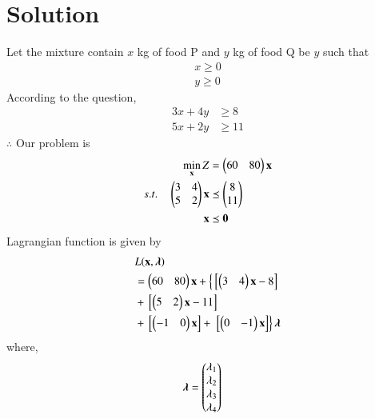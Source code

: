 \documentclass[journal,12pt,twocolumn]{IEEEtran}
\begin{document}
\section{Solution}
\begin{table}[!ht]
\centering
{}
\caption{Food Requirements}
\label{tab:table1}
\end{table}
Let the mixture contain $x$ kg of food P and $y$ kg of food Q be $y$  such that 
\begin{align}
    x \geq 0 \\
    y \geq 0 
\end{align}
According to the question,
\begin{align}
    3x+4y &\geq 8 \\
    5x+2y &\geq 11
\end{align}
$\therefore$ Our problem is
\begin{align}
        \min_{\mathbf{x}} Z &= \begin{pmatrix}60 & 80\end{pmatrix}\mathbf{x}\\
        s.t. \quad 
        \begin{pmatrix}3 & 4 \\ 5 & 2 \end{pmatrix}\mathbf{x} &\preceq \begin{pmatrix}8\\11\end{pmatrix} \\
        \mathbf{x} &\preceq \mathbf{0}
\end{align}
Lagrangian function is given by
\begin{equation}
\begin{aligned}
    &L(\mathbf{x},\boldsymbol{\lambda}) \\ &= \begin{pmatrix}60 & 80\end{pmatrix}\mathbf{x}+\left\{{}\left[\begin{pmatrix}3 & 4\end{pmatrix}\mathbf{x}-8\right]\right. \\ &+ {}\left[\begin{pmatrix}5 & 2\end{pmatrix}\mathbf{x}-11\right] \\ &+ {}\left[\begin{pmatrix}-1 & 0\end{pmatrix}\mathbf{x}\right] +\left.{}\left[\begin{pmatrix}0 & -1\end{pmatrix}\mathbf{x}\right]\right\}\boldsymbol{\lambda}
\end{aligned}
\end{equation}
where,
\begin{align}
    \boldsymbol{\lambda} &= \begin{pmatrix}\lambda_1 \\ \lambda_2 \\ \lambda_3 \\ \lambda_4\end{pmatrix}
\end{align}
\end{document}
